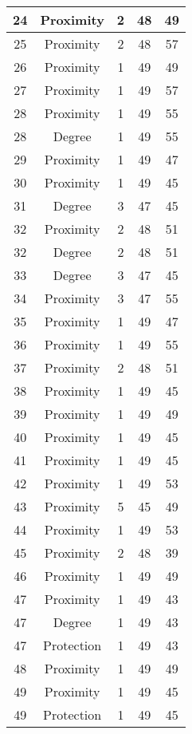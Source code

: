 \documentclass[results.tex]{subfiles}
\begin{document}
\begin{center}
\begin{tabular}{| c || c | c | c | c |}
    \hline
    24 & Proximity & 2 & 48 & 49 \\ 
    \hline
    25 & Proximity & 2 & 48 & 57 \\ 
    \hline
    26 & Proximity & 1 & 49 & 49 \\ 
    \hline
    27 & Proximity & 1 & 49 & 57 \\ 
    \hline
    28 & Proximity & 1 & 49 & 55 \\ 
    \hline
    28 & Degree & 1 & 49 & 55 \\ 
    \hline
    29 & Proximity & 1 & 49 & 47 \\ 
    \hline
    30 & Proximity & 1 & 49 & 45 \\ 
    \hline
    31 & Degree & 3 & 47 & 45 \\ 
    \hline
    32 & Proximity & 2 & 48 & 51 \\ 
    \hline
    32 & Degree & 2 & 48 & 51 \\ 
    \hline
    33 & Degree & 3 & 47 & 45 \\ 
    \hline
    34 & Proximity & 3 & 47 & 55 \\ 
    \hline
    35 & Proximity & 1 & 49 & 47 \\ 
    \hline
    36 & Proximity & 1 & 49 & 55 \\ 
    \hline
    37 & Proximity & 2 & 48 & 51 \\ 
    \hline
    38 & Proximity & 1 & 49 & 45 \\ 
    \hline
    39 & Proximity & 1 & 49 & 49 \\ 
    \hline
    40 & Proximity & 1 & 49 & 45 \\ 
    \hline
    41 & Proximity & 1 & 49 & 45 \\ 
    \hline
    42 & Proximity & 1 & 49 & 53 \\ 
    \hline
    43 & Proximity & 5 & 45 & 49 \\ 
    \hline
    44 & Proximity & 1 & 49 & 53 \\ 
    \hline
    45 & Proximity & 2 & 48 & 39 \\ 
    \hline
    46 & Proximity & 1 & 49 & 49 \\ 
    \hline
    47 & Proximity & 1 & 49 & 43 \\ 
    \hline
    47 & Degree & 1 & 49 & 43 \\ 
    \hline
    47 & Protection & 1 & 49 & 43 \\ 
    \hline
    48 & Proximity & 1 & 49 & 49 \\ 
    \hline
    49 & Proximity & 1 & 49 & 45 \\ 
    \hline
    49 & Protection & 1 & 49 & 45 \\ 
    \hline   \end{tabular}
\end{center}
\end{document}
